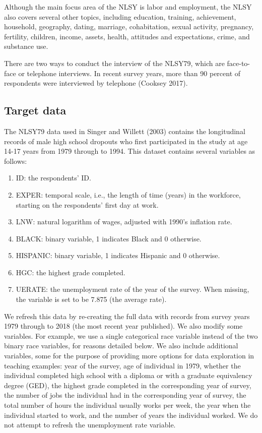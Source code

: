 \documentclass[12pt]{article}
\providecommand{\tightlist}{%
  \setlength{\itemsep}{0pt}\setlength{\parskip}{0pt}}
\begin{document}
Although the main focus area of the NLSY is labor and employment, the NLSY also covers several other topics, including education, training, achievement, household, geography, dating, marriage, cohabitation, sexual activity, pregnancy, fertility, children, income, assets, health, attitudes and expectations, crime, and substance use.

There are two ways to conduct the interview of the NLSY79, which are face-to-face or telephone interviews. In recent survey years, more than 90 percent of respondents were interviewed by telephone (Cooksey 2017).

\hypertarget{target}{%
\subsection{Target data}\label{target}}

The NLSY79 data used in Singer and Willett (2003) contains the longitudinal records of male high school dropouts who first participated in the study at age 14-17 years from 1979 through to 1994. This dataset contains several variables as follows:

\begin{enumerate}
\def\labelenumi{\arabic{enumi}.}
\tightlist
\item
  ID: the respondents' ID.
\item
  EXPER: temporal scale, i.e., the length of time (years) in the workforce, starting on the respondents' first day at work.
\item
  LNW: natural logarithm of wages, adjusted with 1990's inflation rate.
\item
  BLACK: binary variable, 1 indicates Black and 0 otherwise.
\item
  HISPANIC: binary variable, 1 indicates Hispanic and 0 otherwise.
\item
  HGC: the highest grade completed.
\item
  UERATE: the unemployment rate of the year of the survey. When missing, the variable is set to be 7.875 (the average rate).
\end{enumerate}

We refresh this data by re-creating the full data with records from survey years 1979 through to 2018 (the most recent year published). We also modify some variables. For example, we use a single categorical race variable instead of the two binary race variables, for reasons detailed below. We also include additional variables, some for the purpose of providing more options for data exploration in teaching examples: year of the survey, age of individual in 1979, whether the individual completed high school with a diploma or with a graduate equivalency degree (GED), the highest grade completed in the corresponding year of survey, the number of jobs the individual had in the corresponding year of survey, the total number of hours the individual usually works per week, the year when the individual started to work, and the number of years the individual worked. We do not attempt to refresh the unemployment rate variable.
\end{document}
